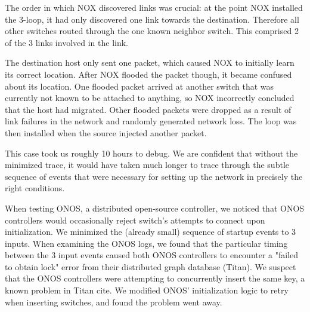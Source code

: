 The order in which NOX discovered links was crucial: at the point NOX
installed the 3-loop, it had only discovered one link towards the destination.
Therefore all other switches routed through the one known neighbor switch.
This comprised 2 of the 3 links involved in the link.

The destination host only sent one packet, which caused NOX to initially learn
its correct location. After NOX flooded the packet though, it became confused
about its location. One flooded packet arrived at
another switch that was currently not known to be attached to anything, so NOX
incorrectly concluded that the host had migrated. Other flooded packets were
dropped as a result of link failures in the network and randomly generated
network loss. The loop was then installed when the source injected another
packet.

This case took us roughly 10 hours to debug. We are confident that without the
minimized trace, it would have taken much
longer to trace through the subtle sequence of events that were necessary for
setting up the network in precisely the right conditions.


 When testing ONOS, a
distributed open-source controller, we noticed that ONOS controllers would
occasionally reject switch's attempts to connect upon initialization.
We minimized the (already small) sequence of startup events to 3 inputs.
When examining the ONOS logs, we found that the particular timing between the 3
input events caused both ONOS controllers to encounter a "failed to obtain
lock" error from their distributed graph database (Titan). We suspect that the ONOS controllers
were attempting to concurrently insert the same key, a known problem in Titan \num{cite}.
We modified ONOS' initialization logic to retry when inserting switches,
and found the problem went away.

